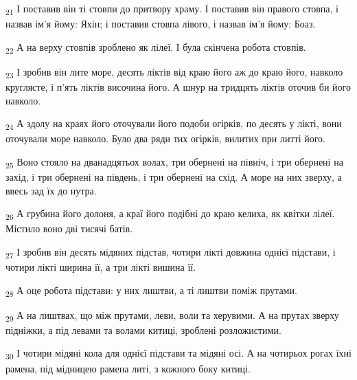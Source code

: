 \begin{tcolorbox}
\textsubscript{21} І поставив він ті стовпи до притвору храму. І поставив він правого стовпа, і назвав ім'я йому: Яхін; і поставив стовпа лівого, і назвав ім'я йому: Боаз.
\end{tcolorbox}
\begin{tcolorbox}
\textsubscript{22} А на верху стовпів зроблено як лілеї. І була скінчена робота стовпів.
\end{tcolorbox}
\begin{tcolorbox}
\textsubscript{23} І зробив він лите море, десять ліктів від краю його аж до краю його, навколо круглясте, і п'ять ліктів височина його. А шнур на тридцять ліктів оточив би його навколо.
\end{tcolorbox}
\begin{tcolorbox}
\textsubscript{24} А здолу на краях його оточували його подоби огірків, по десять у лікті, вони оточували море навколо. Було два ряди тих огірків, вилитих при литті його.
\end{tcolorbox}
\begin{tcolorbox}
\textsubscript{25} Воно стояло на дванадцятьох волах, три обернені на північ, і три обернені на захід, і три обернені на південь, і три обернені на схід. А море на них зверху, а ввесь зад їх до нутра.
\end{tcolorbox}
\begin{tcolorbox}
\textsubscript{26} А грубина його долоня, а краї його подібні до краю келиха, як квітки лілеї. Містило воно дві тисячі батів.
\end{tcolorbox}
\begin{tcolorbox}
\textsubscript{27} І зробив він десять мідяних підстав, чотири лікті довжина однієї підстави, і чотири лікті ширина її, а три лікті вишина її.
\end{tcolorbox}
\begin{tcolorbox}
\textsubscript{28} А оце робота підстави: у них лиштви, а ті лиштви поміж прутами.
\end{tcolorbox}
\begin{tcolorbox}
\textsubscript{29} А на лиштвах, що між прутами, леви, воли та херувими. А на прутах зверху підніжки, а під левами та волами китиці, зроблені розложистими.
\end{tcolorbox}
\begin{tcolorbox}
\textsubscript{30} І чотири мідяні кола для однієї підстави та мідяні осі. А на чотирьох рогах їхні рамена, під мідницею рамена литі, з кожного боку китиці.
\end{tcolorbox}
